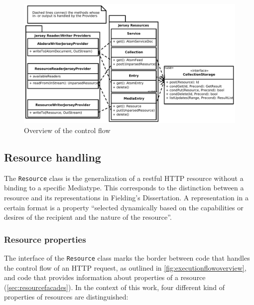 \documentclass[12pt,a4paper,twoside]{scrartcl}		%
\begin{document}
\begin{figure}[htb]
  \centering
  \includegraphics[width=1.2\textwidth]{executionflowoverview}

  \caption{Overview of the control flow}
  \label{fig:executionflowoverview}
\end{figure}

\subsection{Resource handling}
\label{sec:resource-handling}



The \lstinline:Resource: class is the generalization of a restful HTTP resource
without a binding to a specific Mediatype. This corresponds to the distinction
between a resource and its representations in Fielding's
Dissertation\cite[sec. 5.2.1.1]{Fielding2000}. A representation in a certain
format is a property ``selected dynamically based on the capabilities or desires of
the recipient and the nature of the
resource''\cite[p. 87]{Fielding2000}.

\subsubsection{Resource properties}
\label{sec:resource-properties}

The interface of the \lstinline:Resource: class marks the border between code
that handles the control flow of an HTTP request, as outlined in
\autoref{fig:executionflowoverview}, and code that provides information about
properties of a resource (\autoref{sec:resourcefacades}). In the context of this
work, four different kind of properties of resources are distinguished:
\end{document}

